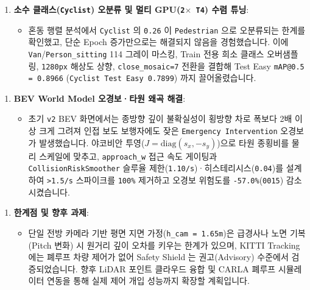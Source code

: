 \documentclass[10.5pt,a4paper]{article}
\begin{document}
\begin{enumerate}[leftmargin=1.8em,itemsep=2pt]
\item \textbf{소수 클래스(\texttt{Cyclist}) 오분류 및 멀티 GPU(\texttt{2$\times$ T4}) 수렴 튜닝}:
\begin{itemize}[leftmargin=1.5em,itemsep=2pt]
\item 혼동 행렬 분석에서 \texttt{Cyclist} 의 \texttt{0.\allowbreak{}26} 이 \texttt{Pedestrian} 으로 오분류되는 한계를 확인했고, 단순 Epoch 증가만으로는 해결되지 않음을 경험했습니다. 이에 \texttt{Van}/\texttt{Person\_\allowbreak{}sitting} 114 그레이 마스킹, Train 전용 희소 클래스 오버샘플링, \texttt{1280px} 해상도 상향, \texttt{close\_\allowbreak{}mosaic=7} 전환을 결합해 Test Easy \texttt{mAP@0.\allowbreak{}5 = 0.\allowbreak{}8966} (\texttt{Cyclist Test Easy 0.\allowbreak{}7899}) 까지 끌어올렸습니다.
\end{itemize}
\end{enumerate}

\begin{enumerate}[leftmargin=1.8em,itemsep=2pt]
\item \textbf{BEV World Model 오경보·타원 왜곡 해결}:
\begin{itemize}[leftmargin=1.5em,itemsep=2pt]
\item 초기 \texttt{v2} BEV 화면에서는 종방향 깊이 불확실성이 횡방향 차로 폭보다 2배 이상 크게 그려져 인접 보도 보행자에도 잦은 \texttt{Emergency Intervention} 오경보가 발생했습니다. 야코비안 투영($J=\text{diag}(s_x,-s_y)$)으로 타원 종횡비를 물리 스케일에 맞추고, \texttt{approach\_\allowbreak{}w} 접근 속도 게이팅과 \texttt{CollisionRiskSmoother} 슬루율 제한(\texttt{1.\allowbreak{}10/\allowbreak{}s})·히스테리시스(\texttt{0.\allowbreak{}04})를 설계하여 \texttt{>1.\allowbreak{}5/\allowbreak{}s} 스파이크를 \texttt{100\%} 제거하고 오경보 위험도를 \texttt{-\allowbreak{}57.\allowbreak{}0\%}(\texttt{0015}) 감소시켰습니다.
\end{itemize}
\end{enumerate}

\begin{enumerate}[leftmargin=1.8em,itemsep=2pt]
\item \textbf{한계점 및 향후 과제}:
\begin{itemize}[leftmargin=1.5em,itemsep=2pt]
\item 단일 전방 카메라 기반 평면 지면 가정(\texttt{h\_\allowbreak{}cam = 1.\allowbreak{}65m})은 급경사나 노면 기복(Pitch 변화) 시 원거리 깊이 오차를 키우는 한계가 있으며, KITTI Tracking에는 폐루프 차량 제어가 없어 Safety Shield 는 권고(Advisory) 수준에서 검증되었습니다. 향후 LiDAR 포인트 클라우드 융합 및 CARLA 폐루프 시뮬레이터 연동을 통해 실제 제어 개입 성능까지 확장할 계획입니다.
\end{itemize}
\end{enumerate}
\end{document}
